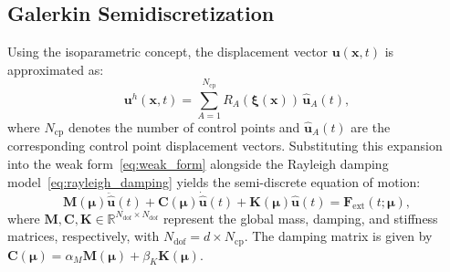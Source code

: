 \begin{table}[htbp]
\centering
\caption{Methodological comparison between classical $C^0$ FEM and $C^{p-1}$ IGA for structural dynamics.}
\label{tab:fem_vs_iga}
\end{table}

\subsection{Galerkin Semidiscretization}
\label{subsec:iga_semidiscretization}
Using the isoparametric concept, the displacement vector $\bm{u}(\bm{x}, t)$ is approximated as:
\begin{equation}
    \bm{u}^h(\bm{x}, t) = \sum_{A=1}^{N_{\text{cp}}} R_A(\bm{\xi}(\bm{x})) \, \hat{\bm{u}}_A(t),
\end{equation}
where $N_{\text{cp}}$ denotes the number of control points and $\hat{\bm{u}}_A(t)$ are the corresponding control point displacement vectors. Substituting this expansion into the weak form~\eqref{eq:weak_form} alongside the Rayleigh damping model~\eqref{eq:rayleigh_damping} yields the semi-discrete equation of motion:
\begin{equation}
    \bm{M}(\bm{\mu}) \ddot{\hat{\bm{u}}}(t) + \bm{C}(\bm{\mu}) \dot{\hat{\bm{u}}}(t) + \bm{K}(\bm{\mu}) \hat{\bm{u}}(t) = \bm{F}_{\text{ext}}(t; \bm{\mu}),
    \label{eq:semidiscrete_system}
\end{equation}
where $\bm{M}, \bm{C}, \bm{K} \in \mathbb{R}^{N_{\text{dof}} \times N_{\text{dof}}}$ represent the global mass, damping, and stiffness matrices, respectively, with $N_{\text{dof}} = d \times N_{\text{cp}}$. The damping matrix is given by $\bm{C}(\bm{\mu}) = \alpha_M \bm{M}(\bm{\mu}) + \beta_K \bm{K}(\bm{\mu})$.
